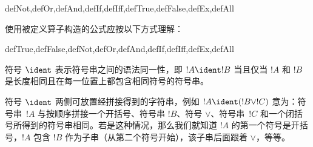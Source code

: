 \documentclass[../../../include/open-logic-section]{subfiles}
\begin{document}
\begin{tagblock}{defNot,defOr,defAnd,defIf,defIff,defTrue,defFalse,defEx,defAll}
\begin{defn}
使用被定义算子构造的公式应按以下方式理解：

\begin{tagenumerate}{defTrue,defFalse,defNot,defOr,defAnd,defIf,defIff,defEx,defAll}







\end{tagenumerate}
\end{defn}
\end{tagblock}

\begin{defn}[语法同一性]
符号 $\ident$ 表示符号串之间的语法同一性，即 $!A \ident !B$ 当且仅当 $!A$ 和 $!B$ 是长度相同且在每一位置上都包含相同符号的符号串。
\end{defn}

符号 $\ident$ 两侧可放置经拼接得到的字符串，例如 $!A \ident (!B \lor !C)$ 意为：符号串~$!A$ 与按顺序拼接一个开括号、符号串 $!B$、符号 $\lor$、符号串~$!C$ 和一个闭括号所得到的符号串相同。若是这种情况，那么我们就知道 $!A$ 的第一个符号是开括号，$!A$ 包含 $!B$ 作为子串（从第二个符号开始），该子串后面跟着 $\lor$，等等。
\end{document}
